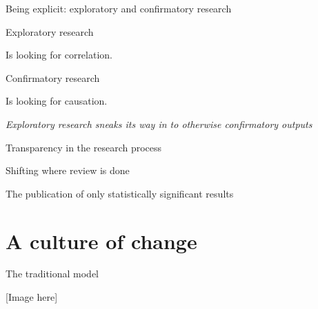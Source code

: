 \documentclass[
  ignorenonframetext,
]{beamer}
\begin{document}
\begin{frame}{Being explicit: exploratory and confirmatory research}
\protect\hypertarget{being-explicit-exploratory-and-confirmatory-research}{}

\begin{block}{Exploratory research}

Is looking for correlation.

\end{block}

\begin{block}{Confirmatory research}

Is looking for causation.

\emph{Exploratory research sneaks its way in to otherwise confirmatory
outputs}

\end{block}

\end{frame}

\begin{frame}{Transparency in the research process}
\protect\hypertarget{transparency-in-the-research-process}{}

\end{frame}

\begin{frame}{Shifting where review is done}
\protect\hypertarget{shifting-where-review-is-done}{}

\end{frame}

\begin{frame}{The publication of only statistically significant results}
\protect\hypertarget{the-publication-of-only-statistically-significant-results}{}

\end{frame}

\hypertarget{a-culture-of-change}{%
\section{A culture of change}\label{a-culture-of-change}}

\begin{frame}{The traditional model}
\protect\hypertarget{the-traditional-model}{}

{[}Image here{]}

\end{frame}
\end{document}
